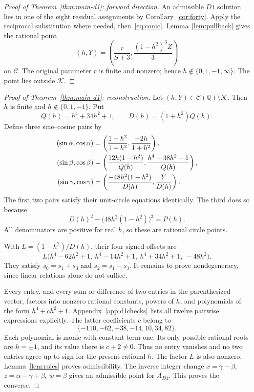 \documentclass[11pt,letterpaper]{article}
\theoremstyle{definition}\newtheorem{definition}[theorem]{Definition}
\theoremstyle{remark}\newtheorem{remark}[theorem]{Remark}
\newcommand{\Q}{\mathbb Q}\newcommand{\Z}{\mathbb Z}\newcommand{\R}{\mathbb R}
\begin{document}
\begin{proof}[Proof of Theorem~\ref{thm:main-d1}: forward direction]
An admissible $D1$ solution lies in one of the eight residual assignments by Corollary~\ref{cor:forty}. Apply the reciprocal substitution where needed, then~\eqref{eq:conic}. Lemma~\ref{lem:pullback} gives the rational point
\[
 (h,Y)=\left(\frac{r}{S+3},\frac{(1-h^2)^3Z}{3}\right)
\]
on $\mathcal C$. The original parameter $r$ is finite and nonzero; hence $h\notin\{0,1,-1,\infty\}$. The point lies outside $\mathcal K$.
\end{proof}

\begin{proof}[Proof of Theorem~\ref{thm:main-d1}: reconstruction]
Let $(h,Y)\in\mathcal C(\Q)\setminus\mathcal K$. Then $h$ is finite and $h\notin\{0,1,-1\}$. Put
\[
 Q(h)=h^4+34h^2+1,\qquad D(h)=(1+h^2)Q(h).
\]
Define three sine--cosine pairs by
\begin{align}
 (\sin\alpha,\cos\alpha)
 &=\left(\frac{1-h^2}{1+h^2},\frac{-2h}{1+h^2}\right),\notag\\
 (\sin\beta,\cos\beta)
 &=\left(\frac{12h(1-h^2)}{Q(h)},
           \frac{h^4-38h^2+1}{Q(h)}\right),\label{eq:reconstruction}\\
 (\sin\gamma,\cos\gamma)
 &=\left(\frac{-48h^2(1-h^2)}{D(h)},\frac{Y}{D(h)}\right).\notag
\end{align}
The first two pairs satisfy their unit-circle equations identically. The third does so because
\begin{equation}\label{eq:Didentity}
 D(h)^2-\bigl(48h^2(1-h^2)\bigr)^2=P(h).
\end{equation}
All denominators are positive for real $h$, so these are rational circle points.

With $L=(1-h^2)/D(h)$, their four signed offsets are
\begin{equation}\label{eq:reconstructedsines}
 L\bigl(h^4-62h^2+1,\ h^4-14h^2+1,\
         h^4+34h^2+1,\ -48h^2\bigr).
\end{equation}
They satisfy $s_0=s_1+s_3$ and $s_2=s_1-s_3$. It remains to prove nondegeneracy, since linear relations alone do not suffice.

Every entry, and every sum or difference of two entries in the parenthesized vector, factors into nonzero rational constants, powers of $h$, and polynomials of the form $h^4+ch^2+1$. Appendix~\ref{app:d1checks} lists all twelve pairwise expressions explicitly. The latter coefficients $c$ belong to
\[
 \{-110,-62,-38,-14,10,34,82\}.
\]
Each polynomial is monic with constant term one. Its only possible rational roots are $h=\pm1$, and its value there is $c+2\ne0$. Thus no entry vanishes and no two entries agree up to sign for the present rational $h$. The factor $L$ is also nonzero. Lemma~\ref{lem:roles} proves admissibility. The inverse integer change $x=\gamma-\beta$, $z=\alpha-\gamma+\beta$, $w=\beta$ gives an admissible point for $A_{D1}$. This proves the converse.
\end{proof}
\end{document}
